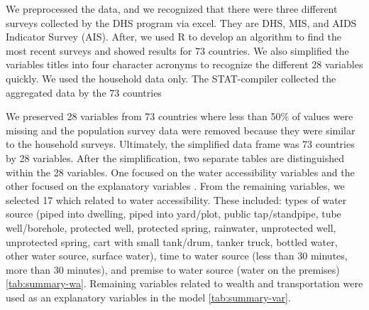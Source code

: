 \documentclass[10pt,twoside]{article}
\numberwithin{equation}{section}
\newcommand{\?}{\stackrel{?}{=}}
\begin{document}
We preprocessed the data, and we recognized that there were three different surveys collected by the DHS program via excel. They are DHS, MIS, and AIDS Indicator Survey (AIS). After, we used R to develop an algorithm to find the most recent surveys and showed results for 73 countries.  We also simplified the variables titles into four character acronyms to recognize the different 28 variables quickly. We used the household data only. The STAT-compiler collected the aggregated data by the 73 countries 

We preserved 28 variables from 73 countries where less than 50\% of values were missing and the population survey data were removed because they were similar to the household surveys. Ultimately, the simplified data frame was 73 countries by 28 variables. After the simplification, two separate tables are distinguished within the 28 variables. One focused on the water accessibility variables and the other focused on the explanatory variables \citep{price2019difference}. From the remaining variables, we selected 17 which related to water accessibility.  These included: types of water source (piped into dwelling, piped into yard/plot,
 public tap/standpipe, tube well/borehole, protected well, protected spring, rainwater, unprotected well, unprotected spring, cart with small tank/drum, tanker truck, bottled water, other water source, surface water), time to water source (less than 30 minutes, more than 30 minutes), and premise to water source (water on the premises) \autoref{tab:summary-wa}. Remaining variables related to wealth and transportation were used as an explanatory variables in the model \autoref{tab:summary-var}. 
\end{document}
